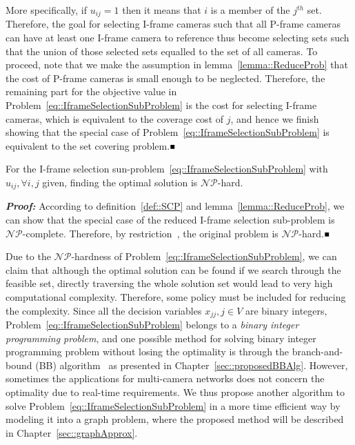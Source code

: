 More specifically, if $u_{ij} = 1$ then it means that $i$ is a member of the $j^{th}$ set.
Therefore, the goal for selecting I-frame cameras such that all P-frame cameras can have at least one I-frame camera to reference thus become selecting sets such that the union of those selected sets equalled to the set of all cameras.
To proceed, note that we make the assumption in lemma~\ref{lemma::ReduceProb} that the cost of P-frame cameras is small enough to be neglected.
Therefore, the remaining part for the objective value in Problem~\eqref{eq::IframeSelectionSubProblem} is the cost for selecting I-frame cameras, which is equivalent to the coverage cost of $j$, and hence we finish showing that the special case of Problem~\eqref{eq::IframeSelectionSubProblem} is equivalent to the set covering problem.\hfill$\mathsmaller{\mathsmaller{\blacksquare}}$

\begin{mythm}
For the I-frame selection sun-problem~\eqref{eq::IframeSelectionSubProblem} with $u_{ij}, \forall i,j$ given, finding the optimal solution is $\mathcal{NP}$-hard.
\end{mythm}
\textbf{\emph{Proof:}}
According to definition~\ref{def::SCP} and lemma~\ref{lemma::ReduceProb}, we can show that the special case of the reduced I-frame selection sub-problem is $\mathcal{NP}$-complete.
Therefore, by restriction~\cite{Restriction}, the original problem is $\mathcal{NP}$-hard.\hfill$\mathsmaller{\mathsmaller{\blacksquare}}$

Due to the $\mathcal{NP}$-hardness of Problem~\eqref{eq::IframeSelectionSubProblem}, we can claim that although the optimal solution can be found if we search through the feasible set, directly traversing the whole solution set would lead to very high computational complexity.
Therefore, some policy must be included for reducing the complexity.
Since all the decision variables ${x_{jj},j \in V}$ are binary integers, Problem~\eqref{eq::IframeSelectionSubProblem} belongs to a \emph{binary integer programming problem}, and one possible method for solving binary integer programming problem without losing the optimality is through the branch-and-bound (BB) algorithm~\cite{BB} as presented in Chapter~\ref{sec::proposedBBAlg}.
However, sometimes the applications for multi-camera networks does not concern the optimality due to real-time requirements.
We thus propose another algorithm to solve Problem~\eqref{eq::IframeSelectionSubProblem} in a more time efficient way by modeling it into a graph problem, where the proposed method will be described in Chapter~\ref{sec::graphApprox}.
%

